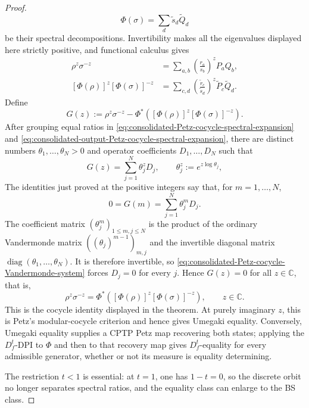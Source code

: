 \documentclass[11pt]{article}
\theoremstyle{remark}
\newcommand{\1}{\mathbbm{1}}
\begin{document}
\begin{proof}
\begin{equation*}
 \Phi(\sigma)=\sum_d\widetilde s_d\widetilde Q_d
\end{equation*}
be their spectral decompositions.  Invertibility makes all the
eigenvalues displayed here strictly positive, and functional calculus
gives
\begin{align}
 \rho^z\sigma^{-z}
 &=\sum_{a,b}\left(\frac{r_a}{s_b}\right)^zP_aQ_b,
 \label{eq:consolidated-Petz-cocycle-spectral-expansion}\\
 [\Phi(\rho)]^z[\Phi(\sigma)]^{-z}
 &=\sum_{c,d}
 \left(\frac{\widetilde r_c}{\widetilde s_d}\right)^z
 \widetilde P_c\widetilde Q_d.
 \label{eq:consolidated-output-Petz-cocycle-spectral-expansion}
\end{align}
Define
\begin{equation*}
 G(z):=\rho^z\sigma^{-z}
 -\Phi^*\!\left(
 [\Phi(\rho)]^z[\Phi(\sigma)]^{-z}\right).
\end{equation*}
After grouping equal ratios in
\eqref{eq:consolidated-Petz-cocycle-spectral-expansion} and
\eqref{eq:consolidated-output-Petz-cocycle-spectral-expansion}, there
are distinct numbers $\theta_1,\ldots,\theta_N>0$ and operator
coefficients $D_1,\ldots,D_N$ such that
\begin{equation}
 G(z)=\sum_{j=1}^N\theta_j^zD_j,
 \qquad \theta_j^z:=e^{z\log\theta_j},
 \label{eq:consolidated-Petz-cocycle-exponential-sum}
\end{equation}
The identities just proved at the positive integers say that, for
$m=1,\ldots,N$,
\begin{equation}
 0=G(m)=\sum_{j=1}^N\theta_j^mD_j.
 \label{eq:consolidated-Petz-cocycle-Vandermonde-system}
\end{equation}
The coefficient matrix $(\theta_j^m)_{1\leq m,j\leq N}$ is the
product of the ordinary Vandermonde matrix
$((\theta_j)^{m-1})_{m,j}$ and the invertible diagonal matrix
$\operatorname{diag}(\theta_1,\ldots,\theta_N)$.  It is therefore
invertible, so
\eqref{eq:consolidated-Petz-cocycle-Vandermonde-system} forces
$D_j=0$ for every $j$.  Hence $G(z)=0$ for all $z\in\mathbb C$, that
is,
\begin{equation}
 \rho^z\sigma^{-z}
 =\Phi^*\!\left(
 [\Phi(\rho)]^z[\Phi(\sigma)]^{-z}\right),
 \qquad z\in\mathbb C.
\end{equation}
This is the cocycle identity displayed in the theorem.  At purely
imaginary $z$, this is Petz's modular-cocycle criterion
\cite[Theorem~3.18(i),(iii),(vi),(viii)]{hiai2017different} and hence
gives Umegaki equality.
Conversely, Umegaki equality supplies a CPTP Petz map recovering both
states; applying the $D_f^t$-DPI to $\Phi$ and then to that
recovery map gives $D_f^t$-equality for every admissible generator,
whether or not its measure is equality determining.

The restriction $t<1$ is essential: at $t=1$, one has $1-t=0$, so the
discrete orbit no longer separates spectral ratios, and the equality
class can enlarge to the BS class.
\end{proof}
\end{document}
